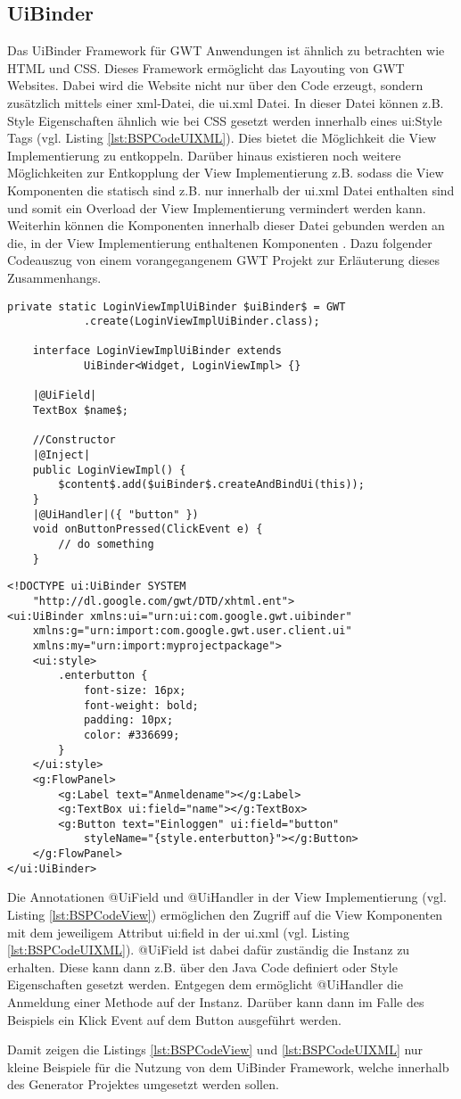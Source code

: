 \subsection{UiBinder}
\label{UiBinder}
Das UiBinder Framework für GWT Anwendungen ist ähnlich zu betrachten wie HTML
und CSS. Dieses Framework ermöglicht das Layouting von GWT Websites. Dabei
wird die Website nicht nur über den Code erzeugt, sondern zusätzlich mittels
einer xml-Datei, die ui.xml Datei. In dieser Datei können z.B. Style
Eigenschaften ähnlich wie bei CSS gesetzt werden innerhalb eines ui:Style
Tags (vgl. Listing \ref{lst:BSPCodeUIXML}). Dies bietet die Möglichkeit die
View Implementierung zu entkoppeln. Darüber hinaus existieren noch weitere
Möglichkeiten zur Entkopplung der View Implementierung z.B.
sodass die View Komponenten die statisch sind z.B. nur innerhalb der ui.xml
Datei enthalten sind und somit ein Overload der View Implementierung vermindert
werden kann. Weiterhin können die Komponenten innerhalb dieser Datei gebunden
werden an die, in der View Implementierung enthaltenen Komponenten
\cite{bib:uiBind}. Dazu folgender Codeauszug von einem vorangegangenem GWT
Projekt zur Erläuterung dieses Zusammenhangs.\\
\lstset{language=gwt}
\begin{lstlisting}[caption={Beispielcode UiBinder in View
Implementierung}, label={lst:BSPCodeView}]
	private static LoginViewImplUiBinder $uiBinder$ = GWT
			.create(LoginViewImplUiBinder.class);

	interface LoginViewImplUiBinder extends 
			UiBinder<Widget, LoginViewImpl> {}

	|@UiField|
	TextBox $name$;
		
	//Constructor
	|@Inject|
	public LoginViewImpl() {
		$content$.add($uiBinder$.createAndBindUi(this));
	}
	|@UiHandler|({ "button" })
	void onButtonPressed(ClickEvent e) {
		// do something
	}
\end{lstlisting}
\lstset{language=uixml}
\begin{lstlisting}[caption={Beispielcode UiBinder in ui.xml},
label={lst:BSPCodeUIXML}]
<!DOCTYPE ui:UiBinder SYSTEM 
	"http://dl.google.com/gwt/DTD/xhtml.ent">
<ui:UiBinder xmlns:ui="urn:ui:com.google.gwt.uibinder"
	xmlns:g="urn:import:com.google.gwt.user.client.ui"
	xmlns:my="urn:import:myprojectpackage">
	<ui:style>
		.enterbutton {
			font-size: 16px;
			font-weight: bold;
			padding: 10px;
			color: #336699;
		}
	</ui:style>
	<g:FlowPanel>
		<g:Label text="Anmeldename"></g:Label>
		<g:TextBox ui:field="name"></g:TextBox>
		<g:Button text="Einloggen" ui:field="button" 
			styleName="{style.enterbutton}"></g:Button>
	</g:FlowPanel> 
</ui:UiBinder> 
\end{lstlisting}
Die Annotationen @UiField und @UiHandler in der View Implementierung (vgl.
Listing \ref{lst:BSPCodeView}) ermöglichen den Zugriff auf die View Komponenten
mit dem jeweiligem Attribut ui:field in der ui.xml (vgl. Listing
\ref{lst:BSPCodeUIXML}). @UiField ist dabei dafür zuständig die Instanz zu
erhalten. Diese kann dann z.B. über den Java Code definiert oder Style
Eigenschaften gesetzt werden. Entgegen dem ermöglicht @UiHandler die Anmeldung
einer Methode auf der Instanz. Darüber kann dann im Falle des Beispiels ein
Klick Event auf dem Button ausgeführt werden.

Damit zeigen die Listings \ref{lst:BSPCodeView} und \ref{lst:BSPCodeUIXML}
nur kleine Beispiele für die Nutzung von dem UiBinder Framework, welche
innerhalb des Generator Projektes umgesetzt werden sollen.



